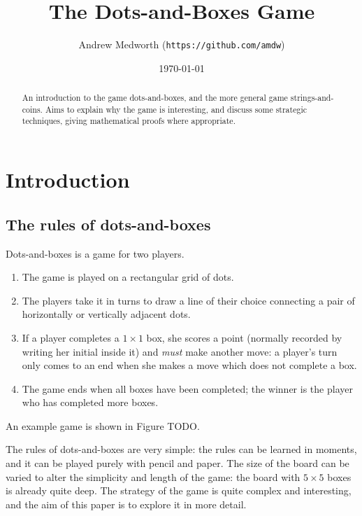 \documentclass[a4paper,twocolumn]{article}
\begin{document}
\title{The Dots-and-Boxes Game}
\author{Andrew Medworth (\texttt{https://github.com/amdw})}
\date{\today}
\maketitle

\begin{abstract}
  An introduction to the game dots-and-boxes, and the more general game
  strings-and-coins. Aims to explain why the game is interesting, and discuss
  some strategic techniques, giving mathematical proofs where appropriate.
\end{abstract}

\tableofcontents

\section{Introduction}

\subsection{The rules of dots-and-boxes}

Dots-and-boxes is a game for two players.

\begin{enumerate}
  \item The game is played on a rectangular grid of dots.
  \item The players take it in turns to draw a line of their choice
    connecting a pair of horizontally or vertically adjacent dots.
  \item If a player completes a $1 \times 1$ box, she scores a point
    (normally recorded by writing her initial inside it) and
    \emph{must} make another move: a player's turn only comes to an
    end when she makes a move which does not complete a box.
  \item The game ends when all boxes have been completed; the winner
    is the player who has completed more boxes.
\end{enumerate}

An example game is shown in Figure TODO.

The rules of dots-and-boxes are very simple: the rules can be learned in
moments, and it can be played purely with pencil and paper. The size of the
board can be varied to alter the simplicity and length of the game: the board
with $5 \times 5$ boxes is already quite deep. The strategy of the game is quite
complex and interesting, and the aim of this paper is to explore it in more
detail.
\end{document}
